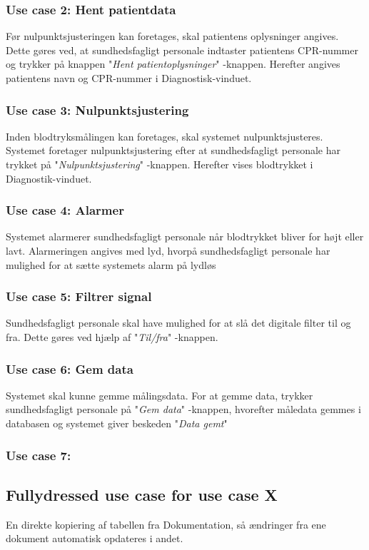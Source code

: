 \subsubsection{Use case 2: Hent patientdata}
Før nulpunktsjusteringen kan foretages, skal patientens oplysninger angives. Dette gøres ved, at sundhedsfagligt personale indtaster patientens CPR-nummer og trykker på knappen "\textit{Hent patientoplysninger}"\- -knappen. Herefter angives patientens navn og CPR-nummer i Diagnostisk-vinduet. 

\subsubsection{Use case 3: Nulpunktsjustering}
Inden blodtryksmålingen kan foretages, skal systemet nulpunktsjusteres. Systemet foretager nulpunktsjustering efter at sundhedsfagligt personale har trykket på "\textit{Nulpunktsjustering}"\- -knappen. Herefter vises blodtrykket i Diagnostik-vinduet.

\subsubsection{Use case 4: Alarmer}
Systemet alarmerer sundhedsfagligt personale når blodtrykket bliver for højt eller lavt. Alarmeringen angives med lyd, hvorpå sundhedsfagligt personale har mulighed for at sætte systemets alarm på lydløs 

\subsubsection{Use case 5: Filtrer signal}
Sundhedsfagligt personale skal have mulighed for at slå det digitale filter til og fra. Dette gøres ved hjælp af "\textit{Til/fra}"\- -knappen.

\subsubsection{Use case 6: Gem data}
Systemet skal kunne gemme målingsdata. For at gemme data, trykker sundhedsfagligt personale på "\textit{Gem data}"\- -knappen, hvorefter måledata gemmes i databasen og systemet giver beskeden "\textit{Data gemt}"

\subsubsection{Use case 7:}

\subsection{Fullydressed use case for use case X}
En direkte kopiering af tabellen fra Dokumentation, så ændringer fra ene dokument automatisk opdateres i andet.



